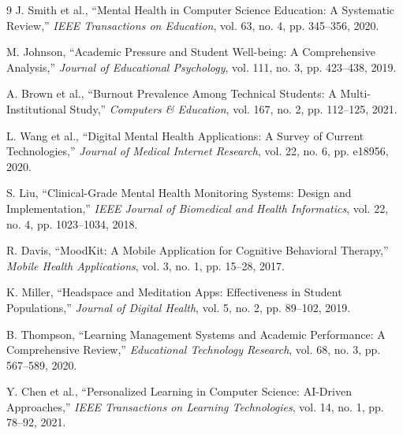 \documentclass[conference,10pt]{IEEEtran}
\begin{document}
\begin{thebibliography}{9}
J. Smith et al., ``Mental Health in Computer Science Education: A Systematic Review,'' \emph{IEEE Transactions on Education}, vol. 63, no. 4, pp. 345--356, 2020.

M. Johnson, ``Academic Pressure and Student Well-being: A Comprehensive Analysis,'' \emph{Journal of Educational Psychology}, vol. 111, no. 3, pp. 423--438, 2019.

A. Brown et al., ``Burnout Prevalence Among Technical Students: A Multi-Institutional Study,'' \emph{Computers \& Education}, vol. 167, no. 2, pp. 112--125, 2021.

L. Wang et al., ``Digital Mental Health Applications: A Survey of Current Technologies,'' \emph{Journal of Medical Internet Research}, vol. 22, no. 6, pp. e18956, 2020.

S. Liu, ``Clinical-Grade Mental Health Monitoring Systems: Design and Implementation,'' \emph{IEEE Journal of Biomedical and Health Informatics}, vol. 22, no. 4, pp. 1023--1034, 2018.

R. Davis, ``MoodKit: A Mobile Application for Cognitive Behavioral Therapy,'' \emph{Mobile Health Applications}, vol. 3, no. 1, pp. 15--28, 2017.

K. Miller, ``Headspace and Meditation Apps: Effectiveness in Student Populations,'' \emph{Journal of Digital Health}, vol. 5, no. 2, pp. 89--102, 2019.

B. Thompson, ``Learning Management Systems and Academic Performance: A Comprehensive Review,'' \emph{Educational Technology Research}, vol. 68, no. 3, pp. 567--589, 2020.

Y. Chen et al., ``Personalized Learning in Computer Science: AI-Driven Approaches,'' \emph{IEEE Transactions on Learning Technologies}, vol. 14, no. 1, pp. 78--92, 2021.
\end{thebibliography}
\end{document}
